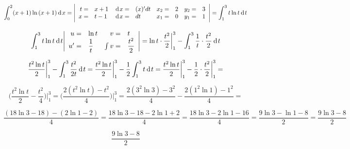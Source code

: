 {}

$$
  \int^{2}_{0} (x+1)\ln{(x+1)}\hspace{2pt}\text{d}\hspace{1pt}{x} =
    \Bigg|
      \begin{array}{ r l r l r l r l }
      t = & x + 1 & \hspace{2pt}\text{d}\hspace{1pt}{x} = & (x)'dt & x_2 = & 2 & y_2 = & 3 \\
      x = & t - 1 & \hspace{2pt}\text{d}\hspace{1pt}{x} = & dt & x_1 =  & 0 & y_1 = & 1 \\
        \end{array}
    \Bigg| =
    \int^3_1 t\ln{t}\hspace{2pt}\text{d}\hspace{1pt}{t}
$$

$$
\int^3_1 t\ln{t}\hspace{2pt}\text{d}\hspace{1pt}{t} \Bigg|
  \begin{array}{ r l r l r l r l }
  u  = & \ln{t}       & v = & t \\
  u' = & \dfrac{1}{t} & \int v = & \dfrac{t^2}{2}  \\
    \end{array}
\Bigg| =
\ln{t} \cdot \dfrac{t^2}{2} \bigg|^3_1 - \int^3_1 \dfrac{1}{t} \cdot \dfrac{t^2}{2} \hspace{2pt}\text{d}\hspace{1pt}{t}
$$

$$
  \dfrac{t^2 \ln{t}}{2} \bigg|^3_1 - \int^3_1 \dfrac{t^2}{2t} \hspace{2pt}\text{d}\hspace{1pt}{t} =
  \dfrac{t^2 \ln{t}}{2} \bigg|^3_1 - \dfrac{1}{2} \int^3_1 t \hspace{2pt}\text{d}\hspace{1pt}{t} =
  \dfrac{t^2 \ln{t}}{2} \bigg|^3_1 - \dfrac{1}{2} \cdot \dfrac{t^2}{2} \bigg|^3_1 =
$$

$$
  \bigg( \dfrac{t^2 \ln{t}}{2}  - \dfrac{t^2}{4} \bigg) \bigg|^3_1 =
  \bigg( \dfrac{2(t^2 \ln{t}) - t^2 } {4}        \bigg) \bigg|^3_1 =
  \dfrac{2(3^2 \ln{3}) - 3^2 } {4} - \dfrac{2(1^2 \ln{1}) - 1^2 } {4} =
$$

$$
  \dfrac{(18\ln{3} - 18) - (2\ln{1}-2)}{4} =
  \dfrac{18\ln{3} - 18 - 2\ln{1}+2}{4} =
  \dfrac{18\ln{3} - 2\ln{1} - 16 }{4} =
  \dfrac{9\ln{3} - \ln{1} - 8 }{2} =
  \dfrac{9\ln{3} - 8 }{2}
$$


$$
\boxed{\dfrac{9\ln{3} - 8 }{2}}
$$
